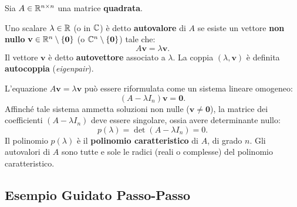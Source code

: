Sia $A \in \mathbb{R}^{n \times n}$ una matrice \textbf{quadrata}.

\begin{definition}
\label{def:autovalore-autovettore}
Uno scalare $\lambda \in \mathbb{R}$ (o in $\mathbb{C}$) \`e detto \textbf{autovalore} di $A$ se esiste un vettore \textbf{non nullo} $\mathbf{v} \in \mathbb{R}^n \setminus \{\mathbf{0}\}$ (o $\mathbb{C}^n \setminus \{\mathbf{0}\}$) tale che:
\begin{equation}
    A\mathbf{v} = \lambda \mathbf{v}.
\end{equation}
Il vettore $\mathbf{v}$ \`e detto \textbf{autovettore} associato a $\lambda$. La coppia $(\lambda, \mathbf{v})$ \`e definita \textbf{autocoppia} (\textit{eigenpair}).
\end{definition}

L'equazione $A\mathbf{v} = \lambda \mathbf{v}$ pu\`o essere riformulata come un sistema lineare omogeneo:
\begin{equation}
    (A - \lambda I_n)\mathbf{v} = \mathbf{0}.
\end{equation}
Affinch\'e tale sistema ammetta soluzioni non nulle ($\mathbf{v} \neq \mathbf{0}$), la matrice dei coefficienti $(A - \lambda I_n)$ deve essere singolare, ossia avere determinante nullo:
\begin{equation}
    p(\lambda) = \det(A - \lambda I_n) = 0.
\end{equation}
Il polinomio $p(\lambda)$ \`e il \textbf{polinomio caratteristico} di $A$, di grado $n$. Gli autovalori di $A$ sono tutte e sole le radici (reali o complesse) del polinomio caratteristico.

\subsection{Esempio Guidato Passo-Passo}

